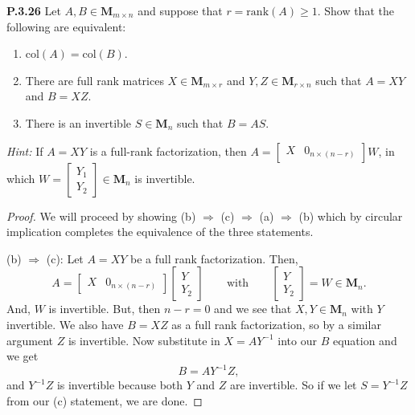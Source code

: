\documentclass[12pt]{amsart}
\begin{document}
\begin{onehalfspace}
        \noindent\textbf{P.3.26} Let $A,B\in\mathbf{M}_{m\times n}$ and suppose that $r = \text{rank}(A)\ge 1$.
        Show that the following are equivalent:
        \begin{enumerate}[label=(\alph*)]
            \item $\text{col}(A) = \text{col}(B)$.
            \item There are full rank matrices $X\in\mathbf{M}_{m\times r}$ and $Y,Z\in\mathbf{M}_{r\times n}$ such that
                  $A=XY$ and $B=XZ$.
            \item There is an invertible $S\in\mathbf{M}_{n}$ such that $B=AS$.
        \end{enumerate}
        \emph{Hint:} If $A=XY$ is a full-rank factorization, then $A=[\begin{matrix}X & 0_{n\times(n-r)}\end{matrix}]W$, in which
        $W=\left[\begin{matrix}Y_1 \\ Y_2\end{matrix}\right]\in\mathbf{M}_n$ is invertible.
        \begin{proof}
            We will proceed by showing (b) $\Rightarrow$ (c) $\Rightarrow$ (a) $\Rightarrow$ (b) which by circular implication
            completes the equivalence of the three statements.

            (b) $\Rightarrow$ (c): Let $A=XY$ be a full rank factorization.
            Then,
            \begin{displaymath}
                A = \left[\begin{matrix}X & 0_{n\times(n-r)}\end{matrix}\right]\left[\begin{matrix}Y\\ Y_2\end{matrix}\right]
                \qquad\text{with}\qquad\left[\begin{matrix}Y\\ Y_2\end{matrix}\right]=W\in\mathbf{M}_n.
            \end{displaymath}
            And, $W$ is invertible. But, then $n-r = 0$ and we see that $X,Y\in\mathbf{M}_n$ with $Y$ invertible.
            We also have $B=XZ$ as a full rank factorization, so by a similar argument $Z$ is invertible.
            Now substitute in $X = AY^{-1}$ into our $B$ equation and we get
            \begin{displaymath}
                B = AY^{-1}Z,
            \end{displaymath}
            and $Y^{-1}Z$ is invertible because both $Y$ and $Z$ are invertible.
            So if we let $S=Y^{-1}Z$ from our (c) statement, we are done.


\end{proof}
\end{onehalfspace}
\end{document}
